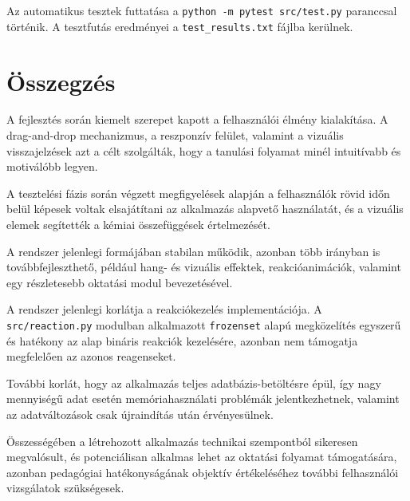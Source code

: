 \documentclass[]{thesis-ekf}
\begin{document}
	Az automatikus tesztek futtatása a \texttt{python -m pytest src/test.py} paranccsal történik. A tesztfutás eredményei a \texttt{test\_results.txt} fájlba kerülnek.
	
	\chapter{Összegzés}
	
	A fejlesztés során kiemelt szerepet kapott a felhasználói élmény kialakítása. A drag-and-drop mechanizmus, a reszponzív felület, valamint a vizuális visszajelzések azt a célt szolgálták, hogy a tanulási folyamat minél intuitívabb és motiválóbb legyen.
	
	A tesztelési fázis során végzett megfigyelések alapján a felhasználók rövid időn belül képesek voltak elsajátítani az alkalmazás alapvető használatát, és a vizuális elemek segítették a kémiai összefüggések értelmezését.
	
	A rendszer jelenlegi formájában stabilan működik, azonban több irányban is továbbfejleszthető, például hang- és vizuális effektek, reakcióanimációk, valamint egy részletesebb oktatási modul bevezetésével.
	
	A rendszer jelenlegi korlátja a reakciókezelés implementációja. A \texttt{src/reaction.py} modulban alkalmazott \texttt{frozenset} alapú megközelítés egyszerű és hatékony az alap bináris reakciók kezelésére, azonban nem támogatja megfelelően az azonos reagenseket.
	
	További korlát, hogy az alkalmazás teljes adatbázis-betöltésre épül, így nagy mennyiségű adat esetén memóriahasználati problémák jelentkezhetnek, valamint az adatváltozások csak újraindítás után érvényesülnek.
	
	Összességében a létrehozott alkalmazás technikai szempontból sikeresen megvalósult, és potenciálisan alkalmas lehet az oktatási folyamat támogatására, azonban pedagógiai hatékonyságának objektív értékeléséhez további felhasználói vizsgálatok szükségesek.
	
\end{document}
